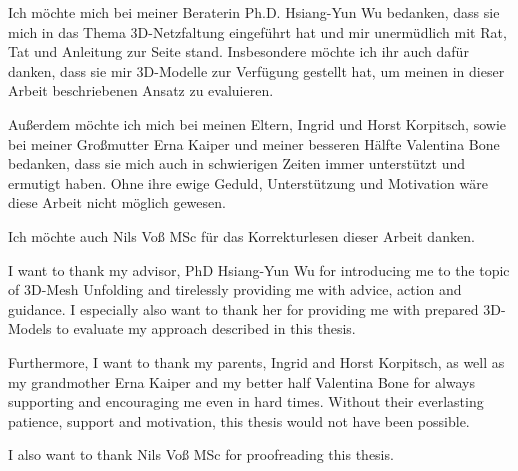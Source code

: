 \documentclass[draft,final]{vutinfth} %
\begin{document}
\frontmatter %

\addstatementpage

\begin{danksagung*}
Ich möchte mich bei meiner Beraterin Ph.D. Hsiang-Yun Wu bedanken, dass sie mich in das Thema 3D-Netzfaltung eingeführt hat und mir unermüdlich mit Rat, Tat und Anleitung zur Seite stand. Insbesondere möchte ich ihr auch dafür danken, dass sie mir 3D-Modelle zur Verfügung gestellt hat, um meinen in dieser Arbeit beschriebenen Ansatz zu evaluieren. 

Außerdem möchte ich mich bei meinen Eltern, Ingrid und Horst Korpitsch, sowie bei meiner Großmutter Erna Kaiper und meiner besseren Hälfte Valentina Bone bedanken, dass sie mich auch in schwierigen Zeiten immer unterstützt und ermutigt haben. Ohne ihre ewige Geduld, Unterstützung und Motivation wäre diese Arbeit nicht möglich gewesen.

Ich möchte auch Nils Voß MSc für das Korrekturlesen dieser Arbeit danken.
\end{danksagung*}

\begin{acknowledgements*}
I want to thank my advisor, PhD Hsiang-Yun Wu for introducing me to the topic of 3D-Mesh Unfolding and tirelessly providing me with advice, action and guidance. I especially also want to thank her for providing me with prepared 3D-Models to evaluate my approach described in this thesis. 

Furthermore, I want to thank my parents, Ingrid and Horst Korpitsch, as well as my grandmother Erna Kaiper and my better half Valentina Bone for always supporting and encouraging me even in hard times. Without their everlasting patience, support and motivation, this thesis would not have been possible.

I also want to thank Nils Voß MSc for proofreading this thesis.
\end{acknowledgements*}
\end{document}
